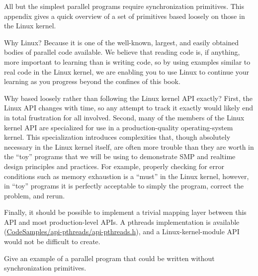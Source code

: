 

All but the simplest parallel programs require synchronization
primitives.
This appendix gives a quick overview of a set of primitives based
loosely on those in the Linux kernel.

Why Linux?
Because it is one of the well-known, largest, and easily obtained
bodies of parallel code available.
We believe that reading code is, if anything, more important to learning
than is writing code, so by using examples similar to real code in
the Linux kernel, we are enabling you to use Linux to continue your
learning as you progress beyond the confines of this book.

Why based loosely rather than following the Linux kernel API exactly?
First, the Linux API changes with time, so any attempt to track it
exactly would likely end in total frustration for all involved.
Second, many of the members of the Linux kernel API are specialized for
use in a production-quality operating-system kernel.
This specialization introduces complexities that, though absolutely
necessary in the Linux kernel itself, are often more trouble than they are
worth in the ``toy'' programs that we will be using to demonstrate
SMP and realtime design principles and practices.
For example, properly checking for error conditions such as memory
exhaustion is a ``must'' in the Linux kernel, however, in ``toy'' programs
it is perfectly acceptable to simply  the program,
correct the problem, and rerun.

Finally, it should be possible to implement a trivial mapping layer between
this API and most production-level APIs.
A pthreads implementation is available
(\url{CodeSamples/api-pthreads/api-pthreads.h}), and
a Linux-kernel-module API would not be difficult to create.

\QuickQuiz{}
	Give an example of a parallel program that could be written
	without synchronization primitives.
 \QuickQuizEnd

